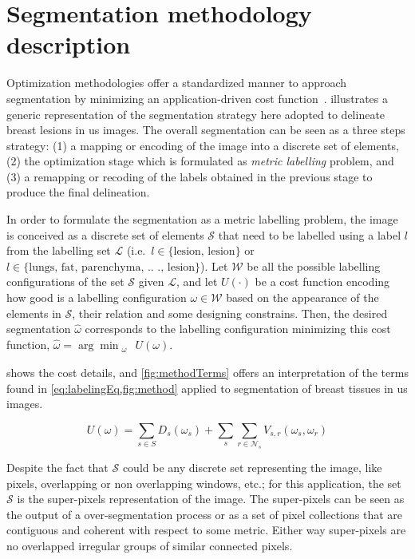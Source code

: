\graphicspath{ {./content/method/figures/} }

\section{Segmentation methodology description} 

Optimization methodologies offer a standardized manner to approach segmentation by minimizing an application-driven cost function~\cite{cremers2007review}.
 illustrates a generic representation of the segmentation strategy here adopted to delineate breast lesions in \ac{us} images. 
The overall segmentation can be seen as a three steps strategy: (1) a mapping or encoding of the image into a discrete set of elements, (2) the optimization stage which is formulated as \emph{metric labelling} problem, and (3) a remapping or recoding of the labels obtained in the previous stage to produce the final delineation. 

In order to formulate the segmentation as a metric labelling problem, the image is conceived as a discrete set of elements $\mathcal{S}$ that need to be labelled using a label $l$ from the labelling set $\mathcal{L}$ (i.e.\, $l \in \text{\{lesion, lesion\}}$ or $l \in \text{\{lungs, fat, parenchyma, .. ., lesion\}}$).
Let $\mathcal{W}$ be all the possible labelling configurations of the set $\mathcal{S}$ given $\mathcal{L}$, and let $U(\cdot)$ be a cost function encoding how good is a labelling configuration $\omega \in \mathcal{W}$ based on the appearance of the elements in $\mathcal{S}$, their relation and some designing constrains.
Then, the desired segmentation $\hat{\omega}$ corresponds to the labelling configuration minimizing this cost function, $\displaystyle \hat{\omega} = \arg \min_{\substack{\omega}} \,U(\omega)$. 

 shows the cost details, and \cref{fig:methodTerms} offers an interpretation of the terms found in \cref{eq:labelingEq,fig:method} applied to segmentation of breast tissues in \ac{us} images.

\begin{equation}
  U(\omega) = \sum_{s\in S} D_s(\omega_s) + \sum_{s}\sum_{r \in \mathcal{N}_{s}} V_{s,r}(\omega_s,\omega_r)
  \label{eq:labelingEq}
\end{equation}

Despite the fact that $\mathcal{S}$ could be any discrete set representing the image, like pixels, overlapping or non overlapping windows, etc.; 
for this application, the set $\mathcal{S}$ is the super-pixels representation of the image. 
The super-pixels can be seen as the output of a over-segmentation process or as a set of pixel collections that are contiguous and coherent with respect to some metric. Either way super-pixels are no overlapped irregular groups of similar connected pixels.

